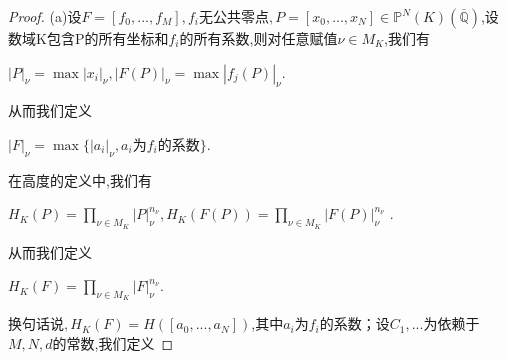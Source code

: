 \documentclass[11pt]{ctexart}
\DeclareMathOperator{\Max}{max}
\begin{document}
\begin{proof}
(a)设$F=[f_0,...,f_M],f_i$无公共零点$,P=[x_0,...,x_N]\in \mathbb{P}^N(K)(\overline{\mathbb{Q}})$,设数域K包含P的所有坐标和$f_i$的所有系数,则对任意赋值$\nu \in M_K$,我们有
\begin{center}
    $|P|_{\nu}=\Max |x_i|_{\nu},|F(P)|_{\nu}=\Max|f_j(P)|_{\nu}$.
\end{center}
从而我们定义
\begin{center}
    $|F|_{\nu}=\Max\{|a_i|_{\nu},a_i$为$f_i$的系数$\}$.
\end{center}
在高度的定义中,我们有
\begin{center}
   $ H_K(P)=\prod\limits_{\nu \in M_K}|P|_{\nu}^{n_{\nu}},H_K(F(P))=\prod\limits_{\nu \in M_K}|F(P)|_{\nu}^{n_{\nu}}$ .
\end{center}
从而我们定义
\begin{center}
    $H_K(F)=\prod\limits_{\nu \in M_K}|F|_{\nu}^{n_{\nu}}$.
\end{center}
换句话说$,H_K(F)=H([a_0,...,a_N])$,其中$a_i$为$f_i$的系数；设$C_1,...$为依赖于$M,N,d$的常数,我们定义


\end{proof}
\end{document}
